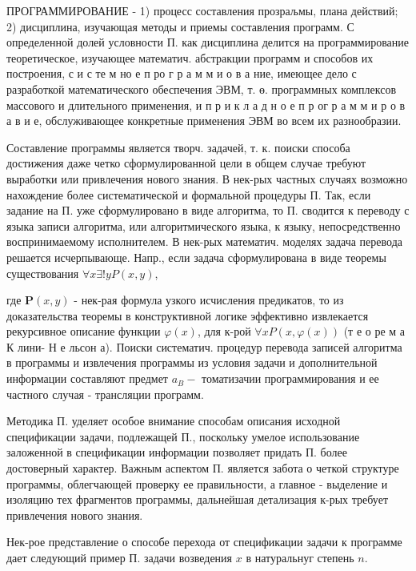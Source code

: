 \documentclass[10pt]{article}
\begin{document}
ПРОГРАММИРОВАНИЕ - 1) процесс составления прозраљмы, плана действий; 2) дисциплина, изучающая методы и приемы составления программ. С определенной долей условности П. как дисциплина делится на программирование теоретическое, изучающее математич. абстракции программ и способов их построения, с и с те м но е п ро г р а м м и о в а ние, имеющее дело с разработкой математического обеспечения ЭВМ, т. ө. программных комплексов массового и длительного применения, и п р и к л а д н о е п р ог р а м м и р о в а в и е, обслуживающее конкретные применения ЭВМ во всем их разнообразии.



Составление программы является творч. задачей, т. к. поиски способа достижения даже четко сформулированной цели в общем случае требуют выработки или привлечения нового знания. В нек-рых частных случаях возможно нахождение более систематической и формальной процедуры П. Так, если задание на П. уже сформулировано в виде алгоритма, то П. сводится к переводу с языка записи алгоритма, или алгоритмического языка, к языку, непосредственно воспринимаемому исполнителем. В нек-рых математич. моделях задача перевода решается исчерпывающе. Напр., если задача сформулирована в виде теоремы существования $\forall x \exists ! y P(x, y)$,



где $\boldsymbol{P}(x, y)$ - нек-рая формула узкого исчисления предикатов, то из доказательства теоремы в конструктивной логике эффективно извлекается рекурсивное описание функции $\varphi(x)$, для к-рой $\forall x P(x, \varphi(x))$ (т е о ре м а $К$ лини- Н е льсон а). Поиски систематич. процедур перевода записей алгоритма в программы и извлечения программы из условия задачи и дополнительной информации составляют предмет $a_{B}-$ томатизачии программирования и ее частного случая - трансляции программ.



Методика П. уделяет особое внимание способам описания исходной спецификации задачи, подлежащей П., поскольку умелое использование заложенной в спецификации информации позволяет придать П. более достоверный характер. Важным аспектом П. является забота о четкой структуре программы, облегчающей проверку ее правильности, а главное - выделение и изоляцию тех фрагментов программы, дальнейшая детализация к-рых требует привлечения нового знания.



Нек-рое представление о способе перехода от спецификации задачи к программе дает следующий пример П. задачи возведения $x$ в натуральнуг степень $n$.
\end{document}
